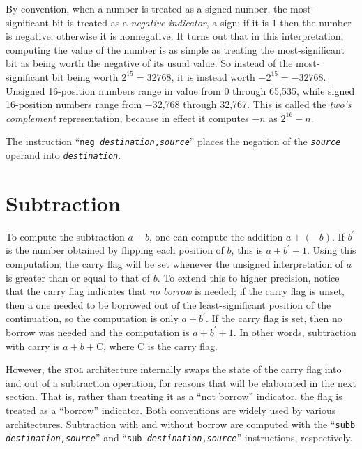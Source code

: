 \documentclass[12pt,english]{book}
\newcommand*{\concept}[2][]{%
  \textit{#2}\ifx#1\empty\empty\index{#2}\else\index{#1}\fi}
\begin{document}
By convention, when a number is treated as a signed number,
the most-significant bit is treated as a \emph{negative indicator},
a sign:
if it is 1 then the number is negative;
otherwise it is nonnegative.
It turns out that in this interpretation,
computing the value of the number
is as simple as treating the most-significant bit
as being worth the negative of its usual value.
So instead of the most-significant bit being worth \(2^{15}=32768\),
it is instead worth \(-2^{15}=-32768\).
Unsigned 16-position numbers range in value from 0 through 65,535,
while signed 16-position numbers range from \(-\)32,768 through 32,767.
This is called the \concept{two's complement} representation,
because in effect it computes \(-n\) as \(2^{16}-n\).

The instruction ``\texttt{neg \textit{destination},\textit{source}}''
places the negation of the \texttt{\textit{source}} operand
into \texttt{\textit{destination}}.

\section{Subtraction}
To compute the subtraction \(a-b\),
one can compute the addition \(a+(-b)\).
If \(b^{\prime}\) is the number obtained
by flipping each position of \(b\),
this is \(a+b^{\prime}+1\).
Using this computation,
the carry flag will be set whenever
the unsigned interpretation of \(a\)
is greater than or equal to that of \(b\).
To extend this to higher precision,
notice that the carry flag indicates that \emph{no borrow} is needed;
if the carry flag is unset,
then a one needed to be borrowed out of the least-significant position
of the continuation,
so the computation is only \(a+b^{\prime}\).
If the carry flag is set,
then no borrow was needed and the computation is \(a+b^{\prime}+1\).
In other words, subtraction with carry is \(a+b+\text{C}\),
where C is the carry flag.

However,
the \textsc{stol} architecture internally swaps the state
of the carry flag into and out of a subtraction operation,
for reasons that will be elaborated in the next section.
That is, rather than treating it as a ``not borrow'' indicator,
the flag is treated as a ``borrow'' indicator.
Both conventions are widely used by various architectures.
Subtraction with and without borrow are computed with the
``\texttt{subb \textit{destination},\textit{source}}''
and
``\texttt{sub \textit{destination},\textit{source}}''
instructions, respectively.
\end{document}

